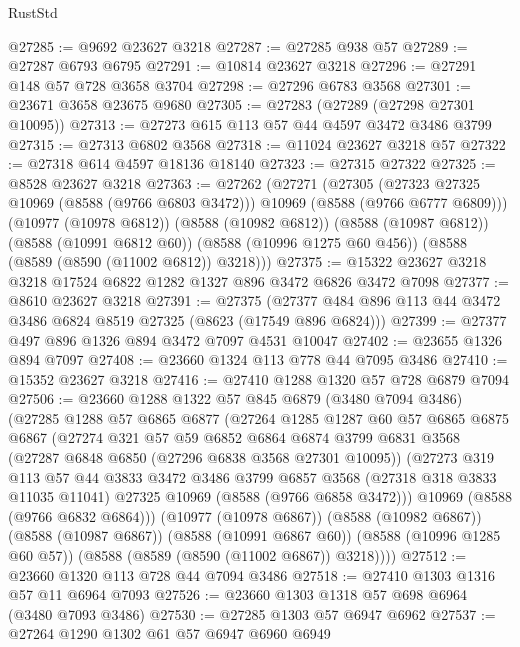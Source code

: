 \begin{lexlean}{RustStd}
\begin{coremodule}
@27285 := @9692 @23627 @3218
@27287 := @27285 @938 @57
@27289 := @27287 @6793 @6795
@27291 := @10814 @23627 @3218
@27296 := @27291 @148 @57 @728 @3658 @3704
@27298 := @27296 @6783 @3568
@27301 := @23671 @3658 @23675 @9680
@27305 := @27283 (@27289 (@27298 @27301 @10095))
@27313 := @27273 @615 @113 @57 @44 @4597 @3472 @3486 @3799
@27315 := @27313 @6802 @3568
@27318 := @11024 @23627 @3218 @57
@27322 := @27318 @614 @4597 @18136 @18140
@27323 := @27315 @27322
@27325 := @8528 @23627 @3218
@27363 := @27262
    (@27271
      (@27305 (@27323 @27325 @10969 (@8588 (@9766 @6803 @3472))) @10969 (@8588 (@9766 @6777 @6809)))
      (@10977 (@10978 @6812))
      (@8588 (@10982 @6812))
      (@8588 (@10987 @6812))
      (@8588 (@10991 @6812 @60))
      (@8588 (@10996 @1275 @60 @456))
      (@8588 (@8589 (@8590 (@11002 @6812)) @3218)))
@27375 := @15322 @23627 @3218 @3218 @17524 @6822 @1282 @1327 @896 @3472 @6826 @3472 @7098
@27377 := @8610 @23627 @3218
@27391 := @27375
    (@27377 @484 @896 @113 @44 @3472 @3486 @6824 @8519 @27325 (@8623 (@17549 @896 @6824)))
@27399 := @27377 @497 @896 @1326 @894 @3472 @7097 @4531 @10047
@27402 := @23655 @1326 @894 @7097
@27408 := @23660 @1324 @113 @778 @44 @7095 @3486
@27410 := @15352 @23627 @3218
@27416 := @27410 @1288 @1320 @57 @728 @6879 @7094
@27506 := @23660
    @1288
    @1322
    @57
    @845
    @6879
    (@3480 @7094 @3486)
    (@27285
      @1288
      @57
      @6865
      @6877
      (@27264
        @1285
        @1287
        @60
        @57
        @6865
        @6875
        @6867
        (@27274
          @321
          @57
          @59
          @6852
          @6864
          @6874
          @3799
          @6831
          @3568
          (@27287 @6848 @6850 (@27296 @6838 @3568 @27301 @10095))
          (@27273
            @319
            @113
            @57
            @44
            @3833
            @3472
            @3486
            @3799
            @6857
            @3568
            (@27318 @318 @3833 @11035 @11041)
            @27325
            @10969
            (@8588 (@9766 @6858 @3472)))
          @10969
          (@8588 (@9766 @6832 @6864)))
        (@10977 (@10978 @6867))
        (@8588 (@10982 @6867))
        (@8588 (@10987 @6867))
        (@8588 (@10991 @6867 @60))
        (@8588 (@10996 @1285 @60 @57))
        (@8588 (@8589 (@8590 (@11002 @6867)) @3218))))
@27512 := @23660 @1320 @113 @728 @44 @7094 @3486
@27518 := @27410 @1303 @1316 @57 @11 @6964 @7093
@27526 := @23660 @1303 @1318 @57 @698 @6964 (@3480 @7093 @3486)
@27530 := @27285 @1303 @57 @6947 @6962
@27537 := @27264 @1290 @1302 @61 @57 @6947 @6960 @6949

\end{coremodule}
\end{lexlean}
